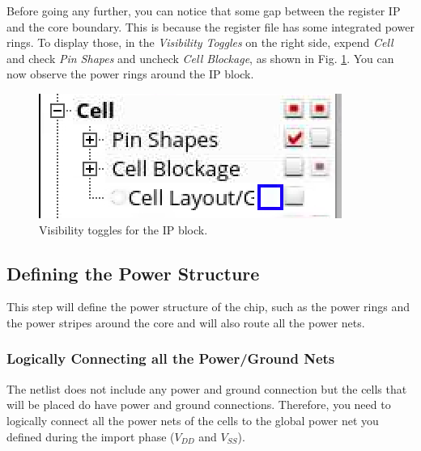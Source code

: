 Before going any further, you can notice that some gap between the register IP and the core boundary. This is because the register file has some integrated power rings. To display those, in the \textit{Visibility Toggles} on the right side, expend \textit{Cell} and check \textit{Pin Shapes} and uncheck \textit{Cell Blockage}, as shown in Fig. \ref{toggles}. You can now observe the power rings around the IP block.

	\begin{figure}[!h]
	\centering
	\includegraphics[scale=0.43]{figures/lab5_backend/halo_view}
	\caption{Visibility toggles for the IP block.}
	\label{toggles}
\end{figure}
\clearpage

\subsection{Defining the Power Structure}\label{power}
This step will define the power structure of the chip, such as the power rings and the power stripes around the core and will also route all the power nets. 

\subsubsection{Logically Connecting all the Power/Ground Nets}
The netlist does not include any power and ground connection but the cells that will be placed do have power and ground connections. Therefore, you need to logically connect all the power nets of the cells to the global power net you defined during the import phase ($V_{DD}$ and $V_{SS}$). 


